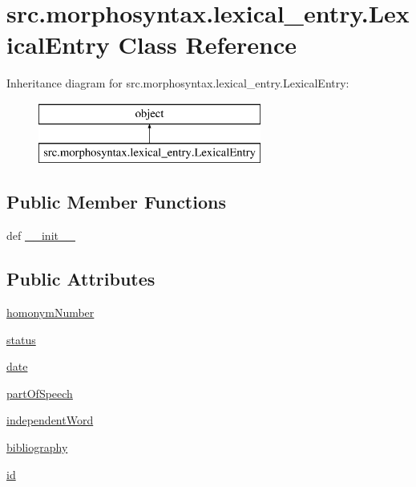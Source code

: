 \hypertarget{classsrc_1_1morphosyntax_1_1lexical__entry_1_1_lexical_entry}{\section{src.\+morphosyntax.\+lexical\+\_\+entry.\+Lexical\+Entry Class Reference}
\label{classsrc_1_1morphosyntax_1_1lexical__entry_1_1_lexical_entry}
}
Inheritance diagram for src.\+morphosyntax.\+lexical\+\_\+entry.\+Lexical\+Entry\+:\begin{figure}[H]
\begin{center}
\leavevmode
\includegraphics[height=2.000000cm]{classsrc_1_1morphosyntax_1_1lexical__entry_1_1_lexical_entry}
\end{center}
\end{figure}
\subsection*{Public Member Functions}
\begin{DoxyCompactItemize}
\item 
def \hyperlink{classsrc_1_1morphosyntax_1_1lexical__entry_1_1_lexical_entry_adc8f0f58f16f337822b85c4b7ca015df}{\+\_\+\+\_\+init\+\_\+\+\_\+}
\end{DoxyCompactItemize}
\subsection*{Public Attributes}
\begin{DoxyCompactItemize}
\item 
\hyperlink{classsrc_1_1morphosyntax_1_1lexical__entry_1_1_lexical_entry_a9ac0a128386a0dc656254cbebc7ed829}{homonym\+Number}
\item 
\hyperlink{classsrc_1_1morphosyntax_1_1lexical__entry_1_1_lexical_entry_afbd57fdab3a5b6b15d9040a882dfe115}{status}
\item 
\hyperlink{classsrc_1_1morphosyntax_1_1lexical__entry_1_1_lexical_entry_ae3d3263b9224d404fbcc19b806de244e}{date}
\item 
\hyperlink{classsrc_1_1morphosyntax_1_1lexical__entry_1_1_lexical_entry_a1cb144581ded335004f86eb400b979d6}{part\+Of\+Speech}
\item 
\hyperlink{classsrc_1_1morphosyntax_1_1lexical__entry_1_1_lexical_entry_adefa1ee60fc0c335a615606c5f7ac039}{independent\+Word}
\item 
\hyperlink{classsrc_1_1morphosyntax_1_1lexical__entry_1_1_lexical_entry_afa27c8784e19b8d3b5239fc3c3fbeec2}{bibliography}
\item 
\hyperlink{classsrc_1_1morphosyntax_1_1lexical__entry_1_1_lexical_entry_ac019dbd081f9cc11ea0e0acc1dc813eb}{id}
\end{DoxyCompactItemize}


